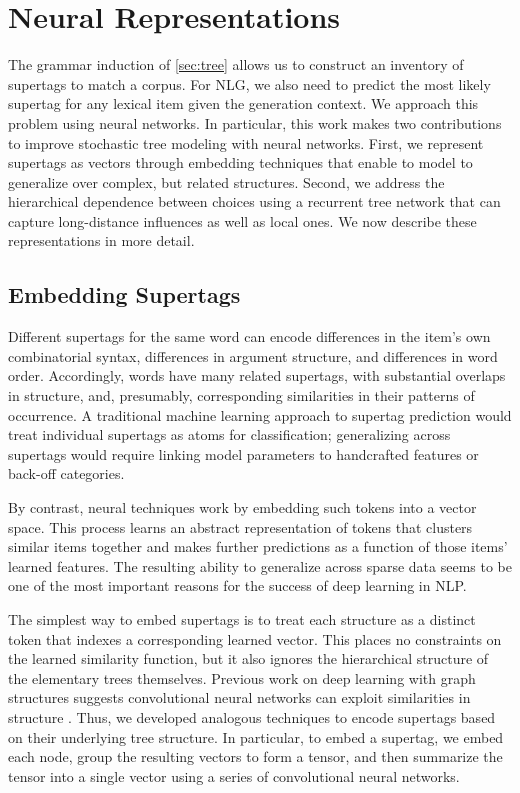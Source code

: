 \documentclass[11pt]{article}
\begin{document}
\section{Neural Representations}
\label{sec:neural}

The grammar induction of \ref{sec:tree} allows us to construct an
inventory of supertags to match a corpus.  For NLG, we also need to
predict the most likely supertag for any lexical item given the
generation context.  We approach this problem using neural
networks. 
%
In particular, this work makes two contributions to improve stochastic
tree modeling with neural networks.
%
First, we represent supertags as vectors through embedding techniques
that enable to model to generalize over complex, but related
structures.
%
Second, we address the hierarchical dependence between choices using a
recurrent tree network that can capture long-distance influences as
well as local ones.
%
We now describe these representations in more detail.

\subsection{Embedding Supertags}

Different supertags for the same word can encode differences in the
item's own combinatorial syntax, differences in argument structure, and
differences in word order.  Accordingly, words have many related
supertags, with substantial overlaps in structure, and, presumably,
corresponding similarities in their patterns of occurrence.  A
traditional machine learning approach to supertag prediction would
treat individual supertags as atoms for classification; generalizing
across supertags would require linking model parameters to handcrafted
features or back-off categories.

By contrast, neural techniques work by embedding such tokens into a
vector space. This process learns an abstract representation of tokens
that clusters similar items together and makes further predictions
as a function of those items' learned features.  The resulting
ability to generalize across sparse data seems to be one of the most
important reasons for the success of deep learning in NLP.

The simplest way to embed supertags is to treat each structure
as a distinct token that indexes a corresponding learned vector.  This
places no constraints on the learned similarity function, but it also
ignores the hierarchical structure of the elementary trees
themselves.  Previous work on deep learning with graph structures
suggests convolutional neural networks can exploit similarities in structure \cite{kalchbrenner2014convolutional,niepert2016learning}.  Thus, we developed
analogous techniques to encode supertags based on their underlying
tree structure.  In particular, to embed a supertag, we embed each
node, group the resulting vectors to form a tensor, and then summarize
the tensor into a single vector using a series of convolutional neural
networks.
\end{document}
